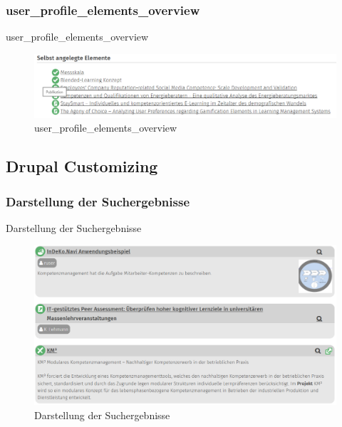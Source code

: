 \subsubsection{user\_profile\_elements\_overview}\label{subsub:userprofileelementsoverview}
user\_profile\_elements\_overview
\begin{figure}[H]
	\centering
	\includegraphics[width=0.80\linewidth]{images/example_userprofile}
	\caption[]{user\_profile\_elements\_overview}
	\label{fig:example_userprofile}
\end{figure}


\subsection{Drupal Customizing}\label{sub:drupal_customizing}


\subsubsection{Darstellung der Suchergebnisse}\label{subsub:suchergebnisse}
Darstellung der Suchergebnisse
\begin{figure}[H]
	\centering
	\includegraphics[height=0.20\textheight]{images/example_searchresult}
	\caption[]{Darstellung der Suchergebnisse}
	\label{fig:example_searchresult}
\end{figure}


